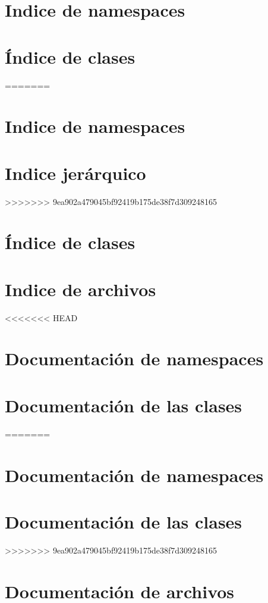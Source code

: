 \documentclass[a4paper]{article}
\begin{document}
\section{\-Indice de namespaces}

\section{Índice de clases}
=======
\section{Indice de namespaces}

\section{Indice jerárquico}
>>>>>>> 9ea902a479045bf92419b175de38f7d309248165

\section{Índice de clases}

\section{\-Indice de archivos}

<<<<<<< HEAD
\section{\-Documentación de namespaces}

\section{\-Documentación de las clases}
=======
\section{Documentación de namespaces}

\section{Documentación de las clases}
>>>>>>> 9ea902a479045bf92419b175de38f7d309248165






\section{\-Documentación de archivos}


\newpage 

\printindex
\end{document}
